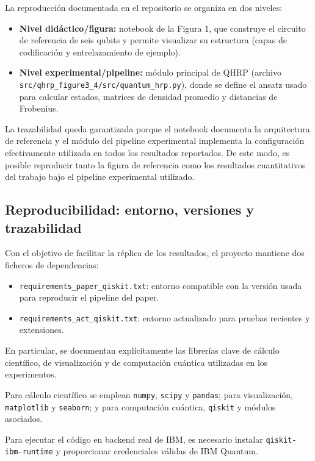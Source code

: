 La reproducción documentada en el repositorio se organiza en dos niveles:
\begin{itemize}
\item \textbf{Nivel didáctico/figura:} notebook de la Figura 1, que construye el circuito de referencia de seis qubits y permite visualizar su estructura (capas de codificación y entrelazamiento de ejemplo).
\item \textbf{Nivel experimental/pipeline:} módulo principal de QHRP (archivo \texttt{src/qhrp\_figure3\_4/src/quantum\_hrp.py}), donde se define el ansatz usado para calcular estados, matrices de densidad promedio y distancias de Frobenius.
\end{itemize}

La trazabilidad queda garantizada porque el notebook documenta la arquitectura de referencia y el módulo del pipeline experimental implementa la configuración efectivamente utilizada en todos los resultados reportados. De este modo, es posible reproducir tanto la figura de referencia como los resultados cuantitativos del trabajo bajo el pipeline experimental utilizado.

\subsection{Reproducibilidad: entorno, versiones y trazabilidad}
\label{sec:reproducibilidad_entorno}

Con el objetivo de facilitar la réplica de los resultados, el proyecto mantiene dos ficheros de dependencias:
\begin{itemize}
\item \texttt{requirements\_paper\_qiskit.txt}: entorno compatible con la versión usada para reproducir el pipeline del paper.
\item \texttt{requirements\_act\_qiskit.txt}: entorno actualizado para pruebas recientes y extensiones.
\end{itemize}

En particular, se documentan explícitamente las librerías clave de cálculo científico, de visualización y de computación cuántica utilizadas en los experimentos.

Para cálculo científico se emplean \texttt{numpy}, \texttt{scipy} y \texttt{pandas}; para visualización, \texttt{matplotlib} y \texttt{seaborn}; y para computación cuántica, \texttt{qiskit} y módulos asociados.

Para ejecutar el código en backend real de IBM, es necesario instalar \texttt{qiskit-ibm-runtime} y proporcionar credenciales válidas de IBM Quantum.

